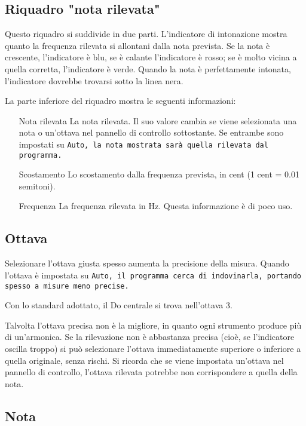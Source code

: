 \subsection{Riquadro "nota rilevata"}\label{detectednote}

Questo riquadro si suddivide in due parti. L'indicatore di
intonazione mostra quanto la frequenza rilevata si allontani
dalla nota prevista. Se la nota è crescente, l'indicatore
è blu, se è calante l'indicatore è rosso; se è molto vicina
a quella corretta, l'indicatore è verde. Quando la nota
è perfettamente intonata, l'indicatore dovrebbe trovarsi
sotto la linea nera.

La parte inferiore del riquadro mostra le seguenti informazioni:

\begin{itemize}
\item[Nota rilevata] La nota rilevata. Il suo valore cambia
se viene selezionata una nota o un'ottava nel pannello di controllo
sottostante. Se entrambe sono impostati su \tt{Auto}, la nota
mostrata sarà quella rilevata dal programma.
\item[Scostamento] Lo scostamento dalla frequenza prevista,
in cent (1 cent = 0.01 semitoni).
\item[Frequenza] La frequenza rilevata in Hz. Questa informazione
è di poco uso.
\end{itemize}

\subsection{Ottava}\label{octave}

Selezionare l'ottava giusta spesso aumenta la precisione della misura.
Quando l'ottava è impostata su \tt{Auto}, il programma cerca di
indovinarla, portando spesso a misure meno precise.

Con lo standard adottato, il Do centrale si trova nell'ottava 3.

Talvolta l'ottava precisa non è la migliore, in quanto ogni strumento
produce più di un'armonica. Se la rilevazione non è abbastanza precisa
(cioè, se l'indicatore oscilla troppo) si può selezionare l'ottava
immediatamente superiore o inferiore a quella originale, senza rischi.
Si ricorda che se viene impostata un'ottava nel pannello di controllo,
l'ottava rilevata potrebbe non corrispondere a quella della nota.

\subsection{Nota}\label{note}

